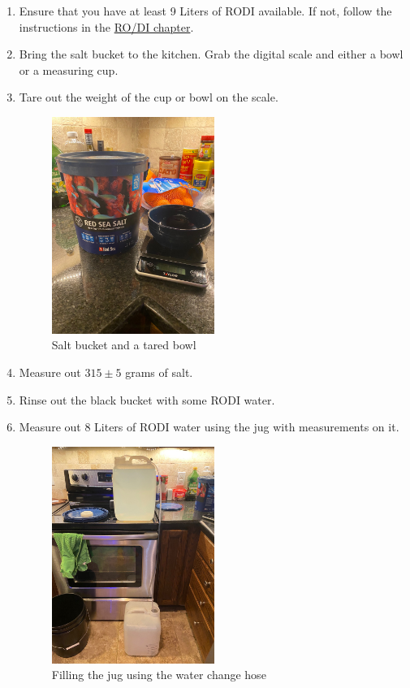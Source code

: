 \documentclass{report}
\begin{document}
\begin{enumerate}
    \item Ensure that you have at least 9 Liters of RODI available. If not, follow the instructions in the \hyperref[sec:rodi]{RO/DI chapter}.
    \item Bring the salt bucket to the kitchen. Grab the digital scale and either a bowl or a measuring cup.
    \item Tare out the weight of the cup or bowl on the scale.
    \begin{figure}[H]
        \centering
        \includegraphics[width=0.5\textwidth, angle=-90]{SaltNScale.jpg}
        \caption{Salt bucket and a tared bowl}
    \end{figure}
    
    \item Measure out $315\pm5$ grams of salt.
    \item Rinse out the black bucket with some RODI water.
    \item Measure out 8 Liters of RODI water using the jug with measurements on it.
    \begin{figure}[H]
        \centering
        \includegraphics[width=0.5\textwidth, angle=-90]{FillingTheJug.jpg}
        \caption{Filling the jug using the water change hose}
    \end{figure}
    

\end{enumerate}
\end{document}
